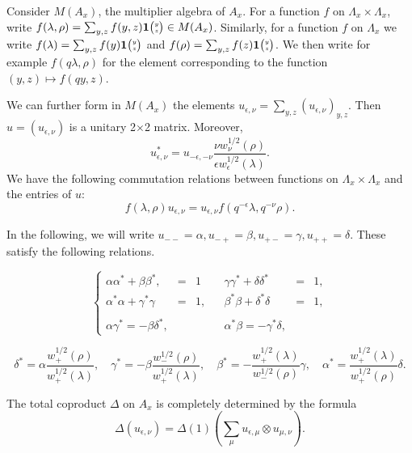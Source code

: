 Consider $M(A_x)$, the multiplier algebra of $A_x$. For a function $f$ on $\Lambda_x\times \Lambda_x$, write $f(\lambda,\rho) = \sum_{y,z} f(y,z)\mathbf{1}{\tiny {\begin{pmatrix} y\\z\end{pmatrix}}} \in M(A_x)$. Similarly, for a function $f$ on $\Lambda_x$ we write $f(\lambda) = \sum_{y,z} f(y)\mathbf{1}{\tiny {\begin{pmatrix} y\\z\end{pmatrix}}}$ and $f(\rho) = \sum_{y,z}f(z)\mathbf{1}{\tiny {\begin{pmatrix} y\\z\end{pmatrix}}}$. We then write for example $f(q\lambda,\rho)$ for the element corresponding to the function $(y,z)\mapsto f(qy,z)$.

We can further form in $M(A_x)$ the elements $u_{\epsilon,\nu} = \sum_{y,z} (u_{\epsilon,\nu})_{y,z}$. Then $u=(u_{\epsilon,\nu})$ is a unitary 2$\times$2 matrix. Moreover, \begin{equation}\label{EqAdju}u_{\epsilon,\nu}^* = u_{-\epsilon,-\nu}\frac{ \nu w_{\nu}^{1/2}(\rho)}{\epsilon w_{\epsilon}^{1/2}(\lambda)}.\end{equation} We have the following commutation relations between functions on $\Lambda_x\times \Lambda_x$ and the entries of $u$: \begin{equation}\label{EqGradu} f(\lambda,\rho)u_{\epsilon,\nu} = u_{\epsilon,\nu}f(q^{-\epsilon}\lambda,q^{-\nu}\rho).\end{equation}

In the following, we will write $u_{--}=\alpha, u_{-+}= \beta, u_{+-}=\gamma,u_{++}=\delta$. These satisfy the following relations.

\begin{equation}\label{EqId1}\left\{\begin{array}{lllllll} \alpha\alpha^* + \beta\beta^*, &=& 1 &&  \gamma\gamma^* + \delta\delta^* &=& 1,\\ \alpha^*\alpha+ \gamma^*\gamma &=&1,&&\beta^*\beta+ \delta^*\delta &=& 1,\\ \\ \alpha \gamma^* = -\beta \delta^*, &&&& \alpha^*\beta = -\gamma^*\delta, \end{array}\right.\end{equation}

\begin{equation}\label{EqId2} \delta^* = \alpha \frac{w_+^{1/2}(\rho)}{w_+^{1/2}(\lambda)}, \quad \gamma^*=  - \beta\frac{w_{-}^{1/2}(\rho)}{w_+^{1/2}(\lambda)},\quad  \beta^* = - \frac{w_+^{1/2}(\lambda)}{w_{-}^{1/2}(\rho)}\gamma, \quad  \alpha^* =  \frac{w_+^{1/2}(\lambda)}{w_+^{1/2}(\rho)}\delta.\end{equation}

The total coproduct $\Delta$ on $A_x$ is completely determined by the formula \[\Delta(u_{\epsilon,\nu}) = \Delta(1)\left(\sum_{\mu} u_{\epsilon,\mu}\otimes u_{\mu,\nu}\right).\]

